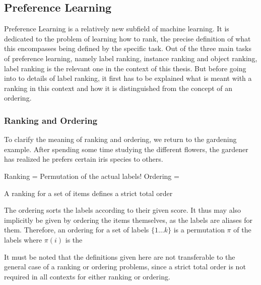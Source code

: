 \subsection{Preference Learning}
Preference Learning is a relatively new subfield of machine learning\cite{DBLP:books/daglib/0025729}. It is dedicated to the problem of learning how to rank, the precise definition of what this encompasses being defined by the specific task. Out of the three main tasks of preference learning, namely label ranking, instance ranking and object ranking, label ranking is the relevant one in the context of this thesis. But before going into to details of label ranking, it first has to be explained what is meant with a ranking in this context and how it is distinguished from the concept of an ordering.

\subsubsection{Ranking and Ordering}
To clarify the meaning of ranking and ordering, we return to the gardening example. After spending some time studying the different flowers, the gardener has realized he prefers certain iris species to others. 

Ranking = Permutation of the actual labels!
Ordering =

A ranking for a set of items defines a strict total order 

The ordering sorts the labels according to their given score. It thus may also implicitly be given by ordering the items themselves, as the labels are aliases for them. Therefore, an ordering for a set of labels $\lbrace 1\dots k\rbrace$ is a permutation $\pi$ of the labels where $\pi(i)$ is the 

It must be noted that the definitions given here are not transferable to the general case of a ranking or ordering problems, since a strict total order is not required in all contexts for either ranking or ordering.

